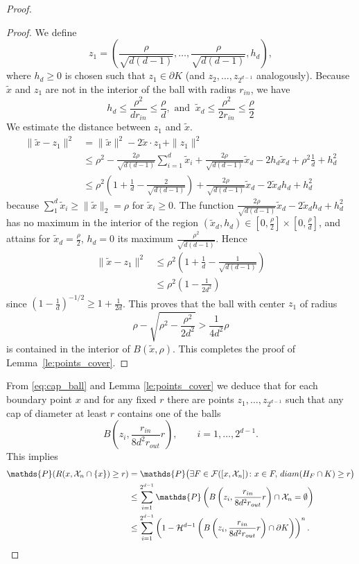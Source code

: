 \documentclass[10pt,a4paper]{amsart}
\def\P{{\mathds{P}}}
\def\bd{{\partial}}
\def\cF{{\mathcal F}}
\def\cH{{\mathcal H}}
\def\cX{{\mathcal X}}
\def\r{{\rho}}
\begin{document}
\begin{proof}
\begin{proof}
We define
$$z_1 = \left(\frac \r {\sqrt {d(d-1)}}, \dots, \frac \rho {\sqrt {d(d-1)}} , h_d \right)    , $$
where $h_d\ge 0$ is chosen such that $z_1 \in \bd K $ (and $z_2, \dots , z_{2^{d-1}}$ analogously).
Because $\tilde x$ and $z_1$ are not in the interior of the ball with radius $r_{in}$, we have
$$
h_d \leq \frac {\r^2}{d r_{in}} \leq \frac {\r}{d }
, \text{ and }\ 
\tilde x_d \leq \frac {\rho^2}{2 r_{in}} \leq \frac {\rho}{2} 
$$
We estimate the distance between $z_1$ and $\tilde x$.
\begin{align*}
\| \tilde x -z_1  \|^2
&=
\| \tilde x \| ^2  -  2 \tilde x \cdot  z_{1}  +  \|z_{1}\|^2
\\ & \leq 
\rho^2   -   \frac{2\rho}{\sqrt{d(d-1)}} \sum_{i=1}^d \tilde x_i + \frac{2 \rho}{\sqrt{d(d-1)}} \tilde x_d - 2 h_d \tilde x_d  +  \rho^2 \frac 1d  + h_d^2
\\ & \leq
\rho^2 \left(1 + \frac 1 d - \frac{2}{\sqrt{d(d-1)}}\right) + \frac{2\rho }{\sqrt{d(d-1)}} \tilde x_d - 2 \tilde x_d h_d  + h_d^2
\end{align*}
because $\sum _1^d \tilde x_i \geq \| \tilde x \|_2 = \rho$ for $\tilde x_i \geq 0$.
The function $ \frac{2\rho }{\sqrt{d(d-1)}} \tilde x_d - 2 \tilde x_d h_d  + h_d^2 $ has no maximum in the interior of the region 
$(\tilde x_d, h_d) \in[0, \frac \rho 2] \times[0, \frac \rho d]$, and attains for $\tilde x_d= \frac \rho 2$, $h_d = 0$ its maximum $\frac{\rho ^2}{\sqrt{d(d-1)}}$. Hence
\begin{align*}
\| \tilde x -z_1  \|^2
& \leq
\rho^2 \left(1 + \frac 1 d - \frac{1}{\sqrt{d(d-1)}} \right)\\
& \leq  
\rho^2 \left(1 - \frac{1}{2d^2} \right)
\end{align*}
since $(1-\frac{1}{d})^{-1/2}\ge 1+\frac{1}{2d}$.
This proves that the ball with center $z_1$ of radius
$$
\rho- \sqrt{ \rho^2 - \frac{\rho^2}{2d^2}  } > \frac 1{4d^2} \rho
$$
is contained in the interior of $B(\tilde x, \rho)$. This completes the proof of Lemma~\ref{le:points_cover}.
\end{proof}

From \eqref{eq:cap_ball} and Lemma \ref{le:points_cover} we deduce that for each boundary point $x$ and for any fixed $r$ there are points $z_1, \dots, z_{2^{d-1}}$ such that any cap of diameter at least $r$ contains one of the balls
$$
B \left(z_i, \frac{r_{in}}{8 d^2 r_{out}} r \right),\qquad i=1,\dots,2^{d-1}.
$$
This implies
\begin{align*}
\P( R(x, \cX_{n} \cap\{x\}) \geq r)
& =
\P\big( \exists F \in \cF([x,\cX_{n}])\colon x \in F,\, {\rm diam}( H_F\cap K ) \geq r \big)
\\ & \leq
\sum_{i=1}^{2^{d-1}} \P  \left( B\left(z_i, \frac{r_{in}}{8 d^2 r_{out}} r \right) \cap \cX_{n} = \emptyset \right)
\\ & \leq
\sum_{i=1}^{2^{d-1}} \left(1- \cH^{d-1} \left(B\left(z_i, \frac{r_{in}}{8 d^2 r_{out}} r \right) \cap \bd K\right) \right)^{n}.
\end{align*}


\end{proof}
\end{document}
